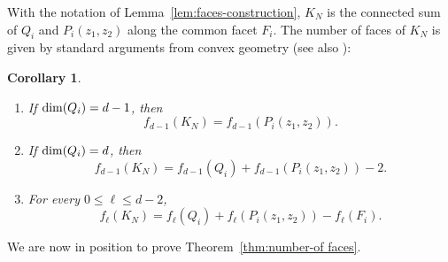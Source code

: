 \documentclass[10pt]{amsart}
\newcommand{\1}{\textbf{1}}
\numberwithin{equation}{section} %
\newtheorem{corollary}[theorem]{Corollary}
\theoremstyle{remark}
\theoremstyle{definition}
\begin{document}
With the notation of Lemma~\ref{lem:faces-construction}, $K_N$ is the connected sum of $Q_i$ and $P_i(z_1,z_2)$ along the common facet $F_i$. The number of faces of $K_N$ is given by standard arguments from convex geometry (see also \cite[Remark~3.2.2]{Rich-Geb}):

\begin{corollary}\label{cor:relations-of-faces}
\leavevmode
    \begin{enumerate}
    \item[{\rm (i)}] If ${\rm dim}(Q_i)=d-1$, then \[f_{d-1}(K_N)=f_{d-1}(P_i(z_1,z_2)).\]
    \item[{\rm (ii)}]If ${\rm dim}(Q_i)=d$, then \[f_{d-1}(K_N)=f_{d-1}(Q_i)+f_{d-1}(P_i(z_1,z_2))-2.\] 
    \item[{\rm (iii)}] For every $0 \leq \ell \leq d-2$, \[f_\ell(K_N)=f_{\ell}(Q_i)+f_{\ell}(P_i(z_1,z_2))-f_\ell(F_i).\]
    \end{enumerate}
\end{corollary}

We are now in position to prove Theorem~\ref{thm:number-of faces}.
\end{document}
